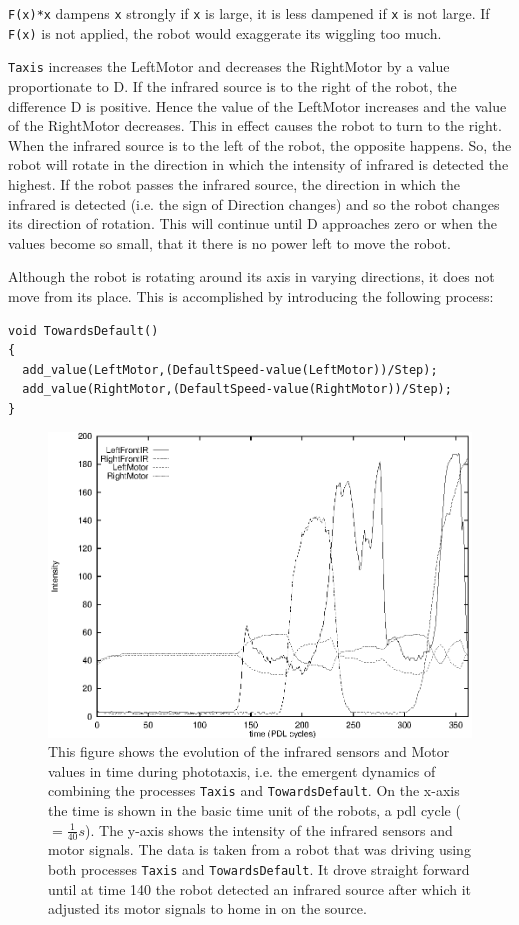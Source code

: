 \texttt{F(x)*x} dampens \texttt{x} strongly if \texttt{x} is large, it is less dampened if \texttt{x} is not large. If \texttt{F(x)} is not applied, the robot would exaggerate its wiggling too much.


\texttt{Taxis} increases the LeftMotor and decreases the RightMotor by a value proportionate to D. If the infrared source is to the right of the robot, the difference D is positive. Hence the value of the LeftMotor increases and the value of the RightMotor decreases. This in effect causes the robot to turn to the right. When the infrared source is to the left of the robot, the opposite happens. So, the robot will rotate in the direction in which the intensity of infrared is detected the highest. If the robot passes the infrared source, the direction in which the infrared is detected (i.e. the sign of Direction changes) and so the robot changes its direction of rotation. This will continue until D approaches zero or when the values become so small, that it there is no power left to move the robot.

Although the robot is rotating around its axis in varying directions, it does not move from its place. This is accomplished by introducing the following process:


{\footnotesize\begin{verbatim}
void TowardsDefault()
{
  add_value(LeftMotor,(DefaultSpeed-value(LeftMotor))/Step);
  add_value(RightMotor,(DefaultSpeed-value(RightMotor))/Step);
}
\end{verbatim}}


\begin{figure}
\centerline{\includegraphics[width=12cm]{robots//irtaxis.eps}}
\caption{This figure shows the evolution of the infrared sensors and Motor values in time during phototaxis, i.e. the emergent dynamics of combining the processes \texttt{Taxis} and \texttt{TowardsDefault}. On the x-axis the time is shown in the basic time unit of the robots, a {\sc pdl} cycle ($= \frac{1}{40} s$). The y-axis shows the intensity of the infrared sensors and motor signals. The data is taken from a robot that was driving using both processes \texttt{Taxis} and \texttt{TowardsDefault}. It drove straight forward until at time 140 the robot detected an infrared source after which it adjusted its motor signals to home in on the source.}
\label{f:irtaxis}
\end{figure}



